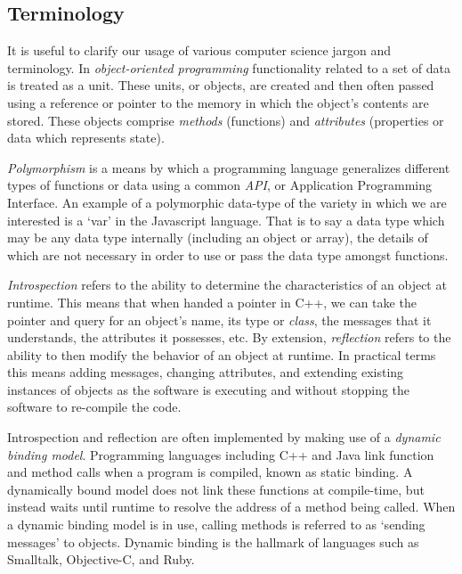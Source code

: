 \documentclass[twoside,10pt]{article}
\begin{document}
\subsection{Terminology} %


It is useful to clarify our usage of various computer science jargon and terminology.  In \emph{object-oriented programming} functionality related to a set of data is treated as a unit.  These units, or objects, are created and then often passed using a reference or pointer to the memory in which the object's contents are stored.  These objects comprise \emph{methods} (functions) and \emph{attributes} (properties or data which represents state).

\emph{Polymorphism} is a means by which a programming language generalizes different types of functions or data using a common \emph{API}, or Application Programming Interface.  An example of a polymorphic data-type of the variety in which we are interested is a `var' in the Javascript language.  That is to say a data type which may be any data type internally (including an object or array), the details of which are not necessary in order to use or pass the data type amongst functions.

\emph{Introspection} refers to the ability to determine the characteristics of an object at runtime.  This means that when handed a pointer in C++, we can take the pointer and query for an object's name, its type or \emph{class}, the messages that it understands, the attributes it possesses, etc.  By extension, \emph{reflection} refers to the ability to then modify the behavior of an object at runtime.  In practical terms this means adding messages, changing attributes, and extending existing instances of objects as the software is executing and without stopping the software to re-compile the code.

Introspection and reflection are often implemented by making use of a \emph{dynamic binding model}.  Programming languages including C++ and Java link function and method calls when a program is compiled, known as static binding.  A dynamically bound model does not link these functions at compile-time, but instead waits until runtime to resolve the address of a method being called.  When a dynamic binding model is in use, calling methods is referred to as `sending messages' to objects.  Dynamic binding is the hallmark of languages such as Smalltalk, Objective-C, and Ruby.
\end{document}
